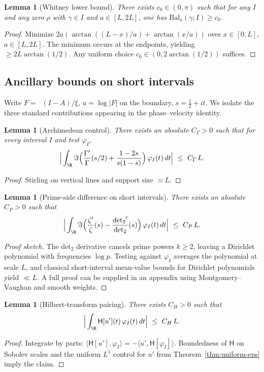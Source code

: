 \documentclass[11pt]{article}
\newtheorem{lemma}[theorem]{Lemma}
\theoremstyle{remark}
\DeclareMathOperator{\dettwo}{det_2}
\begin{document}
\begin{lemma}[Whitney lower bound]\label{lem:whitney-lower}
There exists \(c_0\in(0,\pi)\) such that for any \(I\) and any zero \(\rho\) with \(\gamma\in I\) and \(a\in[L,2L]\), one has \(\mathrm{Bal}_a(\gamma;I)\ge c_0\).
\end{lemma}
\begin{proof}
Minimize \(2a(\arctan((L-x)/a)+\arctan(x/a))\) over \(x\in[0,L]\), \(a\in[L,2L]\). The minimum occurs at the endpoints, yielding \(\ge 2L\arctan(1/2)\). Any uniform choice \(c_0\in(0,2\arctan(1/2))\) suffices.
\end{proof}

\subsection{Ancillary bounds on short intervals}
Write \(F=\dettwo(I-A)/\xi\), \(u=\log|F|\) on the boundary, \(s=\tfrac12+it\). We isolate the three standard contributions appearing in the phase--velocity identity.

\begin{lemma}[Archimedean control]\label{lem:arch}
There exists an absolute \(C_\Gamma>0\) such that for every interval \(I\) and test \(\varphi_I\),
\[ \Big|\int_{\R} \Im\Big(\frac{\Gamma'}{\Gamma}(s/2)+\frac{1-2s}{s(1-s)}\Big)\,\varphi_I(t)\,dt\Big|\ \le\ C_\Gamma\,L.\]
\end{lemma}
\begin{proof}
Stirling on vertical lines and support size \(\asymp L\).
\end{proof}

\begin{lemma}[Prime-side difference on short intervals]\label{lem:prime-short}
There exists an absolute \(C_P>0\) such that
\[ \Big|\int_{\R} \Im\Big(\frac{\zeta'}{\zeta}(s)-\frac{\dettwo'}{\dettwo}(s)\Big)\,\varphi_I(t)\,dt\Big|\ \le\ C_P\,L.\]
\end{lemma}
\begin{proof}[Proof sketch]
The det$_2$ derivative cancels prime powers \(k\ge 2\), leaving a Dirichlet polynomial with frequencies \(\log p\). Testing against \(\varphi_I\) averages the polynomial at scale \(L\), and classical short-interval mean-value bounds for Dirichlet polynomials yield \(\ll L\). A full proof can be supplied in an appendix using Montgomery--Vaughan and smooth weights.
\end{proof}

\begin{lemma}[Hilbert-transform pairing]\label{lem:hilbert}
There exists \(C_H>0\) such that
\[ \Big|\int_{\R} \mathsf H[u'](t)\,\varphi_I(t)\,dt\Big|\ \le\ C_H\,L.\]
\end{lemma}
\begin{proof}
Integrate by parts: \(\langle \mathsf H[u'],\varphi_I\rangle=-\langle u',\mathsf H[\varphi_I]\rangle\). Boundedness of \(\mathsf H\) on Sobolev scales and the uniform \(L^1\) control for \(u'\) from Theorem~\ref{thm:uniform-eps} imply the claim.
\end{proof}
\end{document}
